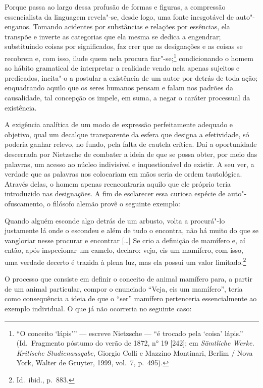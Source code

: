 Porque passa ao largo dessa profusão de formas e figuras, a compressão
essencialista da linguagem revela"-se, desde logo, uma fonte
inesgotável de auto"-enganos. Tomando acidentes por substâncias e
relações por essências, ela transpõe e inverte as categorias que ela mesma
se dedica a engendrar; substituindo coisas por significados, faz crer
que as designações e as coisas se recobrem e, com isso, ilude quem nela
procura fiar"-se;\footnote{ “O conceito ‘lápis’” --- escreve Nietzsche ---
“é trocado pela ‘coisa’ lápis.” (Id.~Fragmento póstumo do verão de
1872, n° 19 [242]; em \textit{Sämtliche Werke. Kritische
Studienausgabe}, Giorgio Colli e Mazzino Montinari, Berlim / Nova
York, Walter de Gruyter, 1999, vol.~7, p.~495).} condicionando o homem
ao hábito gramatical de interpretar a realidade vendo nela apenas
sujeitos e predicados, incita"-o a postular a existência de um autor
por detrás de toda ação; enquadrando aquilo que os seres humanos pensam
e falam nos padrões da causalidade, tal concepção os impele, em
suma, a negar o caráter processual da existência.

A exigência analítica de um modo de expressão perfeitamente
adequado e objetivo, qual um decalque transparente da esfera que
designa a efetividade, só poderia ganhar relevo, no fundo, pela falta de
cautela crítica. Daí a oportunidade descerrada por Nietzsche de
combater a ideia de que se possa obter, por meio das palavras, um
acesso ao núcleo indivisível e inquestionável do existir. 
A seu ver, a verdade que as
palavras nos colocariam em mãos seria de ordem tautológica. Através
delas, o homem apenas reencontraria aquilo que ele próprio teria
introduzido nas designações. A fim de esclarecer essa curiosa espécie
de auto"-ofuscamento, o filósofo alemão provê o seguinte exemplo:

\begin{hedraquote}
Quando alguém esconde algo detrás de um arbusto, volta a
procurá"-lo justamente lá onde o escondeu e além de tudo o encontra,
não há muito do que se vangloriar nesse procurar e encontrar [\ldots{}] Se
crio a definição de mamífero e, aí então, após inspecionar um camelo,
declaro: veja, eis um mamífero, com isso, uma verdade decerto é trazida
à plena luz, mas ela possui um valor limitado.\footnote{ Id.~ibid., p.~883.}
\end{hedraquote}

O processo que consiste em definir o conceito de animal mamífero para,
a partir de um animal particular, compor o enunciado “Veja,
eis um mamífero”, teria como consequência a ideia de que o “ser”
mamífero pertenceria essencialmente ao exemplo individual. O que já não
ocorreria no seguinte caso: 


